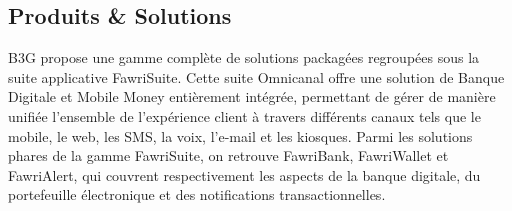 








\subsection{Produits \& Solutions}

\hspace{\parindent}B3G propose une gamme complète de solutions packagées regroupées sous la suite applicative FawriSuite. Cette suite Omnicanal offre une solution de Banque Digitale et Mobile Money entièrement intégrée, permettant de gérer de manière unifiée l'ensemble de l'expérience client à travers différents canaux tels que le mobile, le web, les SMS, la voix, l'e-mail et les kiosques. Parmi les solutions phares de la gamme FawriSuite, on retrouve FawriBank, FawriWallet et FawriAlert, qui couvrent respectivement les aspects de la banque digitale, du portefeuille électronique et des notifications transactionnelles.

